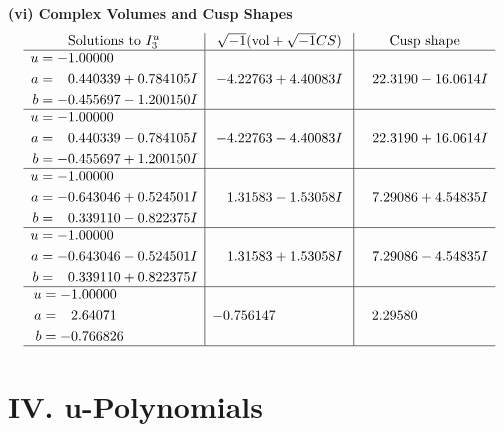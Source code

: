 \documentclass[1p]{elsarticle_modified}
\theoremstyle{definition}
\newcommand{\I}{\sqrt{-1}}
\begin{document}
\newpage\flushleft \textbf{(vi) Complex Volumes and Cusp Shapes}
$$\begin{array}{c|c|c}  
\text{Solutions to }I^u_{3}& \I (\text{vol} + \sqrt{-1}CS) & \text{Cusp shape}\\
 \hline 
\begin{aligned}
u &= -1.00000\phantom{ +0.000000I} \\
a &= \phantom{-}0.440339 + 0.784105 I \\
b &= -0.455697 - 1.200150 I\end{aligned}
 & -4.22763 + 4.40083 I & \phantom{-}22.3190 - 16.0614 I \\ \hline\begin{aligned}
u &= -1.00000\phantom{ +0.000000I} \\
a &= \phantom{-}0.440339 - 0.784105 I \\
b &= -0.455697 + 1.200150 I\end{aligned}
 & -4.22763 - 4.40083 I & \phantom{-}22.3190 + 16.0614 I \\ \hline\begin{aligned}
u &= -1.00000\phantom{ +0.000000I} \\
a &= -0.643046 + 0.524501 I \\
b &= \phantom{-}0.339110 - 0.822375 I\end{aligned}
 & \phantom{-}1.31583 - 1.53058 I & \phantom{-}7.29086 + 4.54835 I \\ \hline\begin{aligned}
u &= -1.00000\phantom{ +0.000000I} \\
a &= -0.643046 - 0.524501 I \\
b &= \phantom{-}0.339110 + 0.822375 I\end{aligned}
 & \phantom{-}1.31583 + 1.53058 I & \phantom{-}7.29086 - 4.54835 I \\ \hline\begin{aligned}
u &= -1.00000\phantom{ +0.000000I} \\
a &= \phantom{-}2.64071\phantom{ +0.000000I} \\
b &= -0.766826\phantom{ +0.000000I}\end{aligned}
 & -0.756147\phantom{ +0.000000I} & \phantom{-}2.29580\phantom{ +0.000000I}\\
 \hline 
 \end{array}$$\newpage
\newpage\renewcommand{\arraystretch}{1}
\centering \section*{ IV. u-Polynomials}
\end{document}
